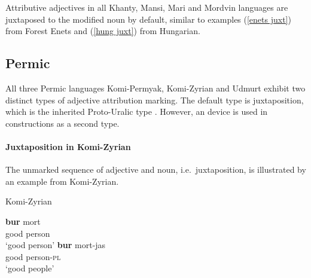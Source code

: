 Attributive adjectives in all Khanty, Mansi, Mari and Mordvin languages are juxtaposed to the modified noun by default, similar to examples (\ref{enets juxt}) from Forest Enets and (\ref{hung juxt}) from Hungarian.

\subsection{Permic}
All three Permic languages Komi-Permyak, Komi-Zyrian and Udmurt exhibit two distinct types of adjective attribution marking. The default type is juxtaposition, which is the inherited Proto\hyp{}Uralic type \citep[80–81]{decsy1990}. However, an  device is used in  constructions as a second type.

\paragraph*{Juxtaposition in Komi-Zyrian}
The unmarked sequence of adjective and noun, i.e.~juxtaposition, is illustrated by an example from Komi-Zyrian.
\begin{exe}
\ex \rm{Komi-Zyrian \citep[287]{lytkin1966a}}
\begin{xlist} 
\ex
\gll 		\textbf{bur} 	mort\\
		good	person\\
\glt		‘good person’
\ex
\gll		\textbf{bur}	mort-jas\\
		good	person-\textsc{pl}\\
\glt		‘good people’
\end{xlist}
\end{exe}

